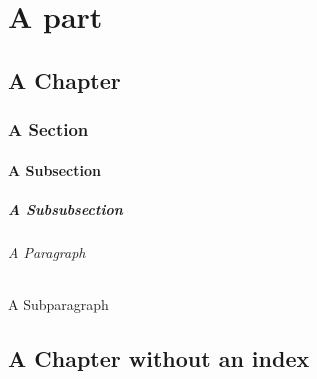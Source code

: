 \documentclass{book}
\begin{document}
\part{A part}
\chapter{A Chapter}
\section{A Section}
\subsection{A Subsection}
\subsubsection{A Subsubsection}
\paragraph{A Paragraph}
\subparagraph{A Subparagraph}

\lipsum


\chapter*{A Chapter without an index}

\lipsum
	
\end{document}
